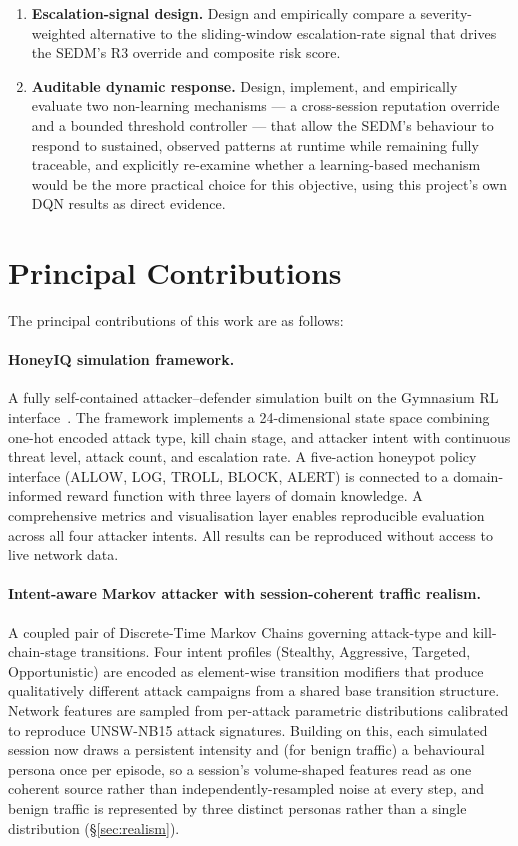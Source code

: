\begin{enumerate}
  \item \textbf{Escalation-signal design.}
        Design and empirically compare a severity-weighted alternative to
        the sliding-window escalation-rate signal that drives the SEDM's
        R3 override and composite risk score.

  \item \textbf{Auditable dynamic response.}
        Design, implement, and empirically evaluate two non-learning
        mechanisms --- a cross-session reputation override and a bounded
        threshold controller --- that allow the SEDM's behaviour to
        respond to sustained, observed patterns at runtime while remaining
        fully traceable, and explicitly re-examine whether a
        learning-based mechanism would be the more practical choice for
        this objective, using this project's own DQN results as direct
        evidence.
\end{enumerate}

\section{Principal Contributions}

The principal contributions of this work are as follows:

\paragraph{HoneyIQ simulation framework.}
A fully self-contained attacker--defender simulation built on the Gymnasium RL
interface~\citep{towers2024gymnasium}.
The framework implements a 24-dimensional state space combining one-hot encoded
attack type, kill chain stage, and attacker intent with continuous threat level,
attack count, and escalation rate.
A five-action honeypot policy interface (ALLOW, LOG, TROLL, BLOCK, ALERT) is
connected to a domain-informed reward function with three layers of domain
knowledge.
A comprehensive metrics and visualisation layer enables reproducible evaluation
across all four attacker intents.
All results can be reproduced without access to live network data.

\paragraph{Intent-aware Markov attacker with session-coherent traffic
realism.}
A coupled pair of Discrete-Time Markov Chains governing attack-type and
kill-chain-stage transitions.
Four intent profiles (Stealthy, Aggressive, Targeted, Opportunistic) are
encoded as element-wise transition modifiers that produce qualitatively
different attack campaigns from a shared base transition structure.
Network features are sampled from per-attack parametric distributions
calibrated to reproduce UNSW-NB15 attack signatures.
Building on this, each simulated session now draws a persistent intensity
and (for benign traffic) a behavioural persona once per episode, so a
session's volume-shaped features read as one coherent source rather than
independently-resampled noise at every step, and benign traffic is
represented by three distinct personas rather than a single distribution
(\S\ref{sec:realism}).

